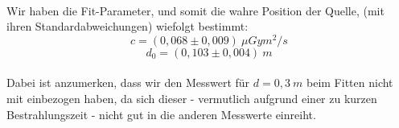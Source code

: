 \begin{center}
	\minipanf    
        \label{fig:Abstandsquadrat}
    \minipend
    \vspace{5mm}
\end{center}
\ \\
Wir haben die Fit-Parameter, und somit die wahre Position der Quelle, (mit ihren Standardabweichungen) wiefolgt bestimmt:
\begin{equation*}
		c = (0,068 \pm 0,009)\ \unit{\mu Gy m^2/s}
\end{equation*}
\begin{equation*}
		d_0 = (0,103 \pm 0,004)\ \unit{m}
\end{equation*}
\ \\
Dabei ist anzumerken, dass wir den Messwert für $d=0,3\ \unit{m}$ beim Fitten nicht mit einbezogen haben, da sich dieser - vermutlich aufgrund einer zu kurzen Bestrahlungszeit - nicht gut in die anderen Messwerte einreiht.

